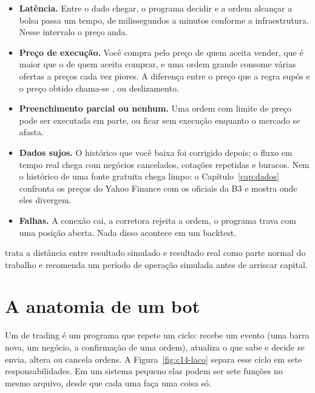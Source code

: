 \begin{itemize}
  \item \textbf{Latência.} Entre o dado chegar, o programa decidir e a ordem alcançar a bolsa passa um tempo, de milissegundos a minutos conforme a infraestrutura. Nesse intervalo o preço anda.
  \item \textbf{Preço de execução.} Você compra pelo preço de quem aceita vender, que é maior que o de quem aceita comprar, e uma ordem grande consome várias ofertas a preços cada vez piores. A diferença entre o preço que a regra supôs e o preço obtido chama-se , ou deslizamento.
  \item \textbf{Preenchimento parcial ou nenhum.} Uma ordem com limite de preço pode ser executada em parte, ou ficar sem execução enquanto o mercado se afasta.
  \item \textbf{Dados sujos.} O histórico que você baixa foi corrigido depois; o fluxo em tempo real chega com negócios cancelados, cotações repetidas e buracos. Nem o histórico de uma fonte gratuita chega limpo: o Capítulo~\ref{cap:dados} confronta os preços do Yahoo Finance com os oficiais da B3 e mostra onde eles divergem.
  \item \textbf{Falhas.} A conexão cai, a corretora rejeita a ordem, o programa trava com uma posição aberta. Nada disso acontece em um backtest.
\end{itemize}

\citet{chan2021} trata a distância entre resultado simulado e resultado real como parte normal do trabalho e recomenda um período de operação simulada antes de arriscar capital.

\section{A anatomia de um bot}

Um  de trading é um programa que repete um ciclo: recebe um evento (uma barra nova, um negócio, a confirmação de uma ordem), atualiza o que sabe e decide se envia, altera ou cancela ordens. A Figura~\ref{fig:c14-laco} separa esse ciclo em sete responsabilidades. Em um sistema pequeno elas podem ser sete funções no mesmo arquivo, desde que cada uma faça uma coisa só.

